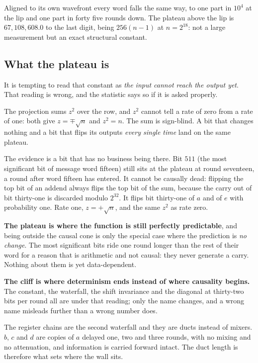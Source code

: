 Aligned to its own wavefront every word falls the same way, to one part in \(10^{4}\) at the lip and
one part in forty five rounds down. The plateau above the lip is \(67{,}108{,}608.0\) to the last
digit, being \(256(n-1)\) at \(n = 2^{18}\): not a large measurement but an exact structural
constant.

\subsection{What the plateau is}

It is tempting to read that constant as \emph{the input cannot reach the output yet}. That reading
is wrong, and the statistic says so if it is asked properly.

The projection sums \(z^{2}\) over the row, and \(z^{2}\) cannot tell a rate of zero from a rate of
one: both give \(z = \mp\sqrt{n}\) and \(z^{2} = n\). The sum is sign-blind. A bit that changes
nothing and a bit that flips its outputs \emph{every single time} land on the same plateau.

The evidence is a bit that has no business being there. Bit \(511\) (the most significant bit of
message word fifteen) still sits at the plateau at round seventeen, a round after word fifteen
has entered. It cannot be causally dead: flipping the top bit of an addend always flips the top bit
of the sum, because the carry out of bit thirty-one is discarded modulo \(2^{32}\). It flips bit
thirty-one of \(a\) and of \(e\) with probability one. Rate one, \(z = +\sqrt{n}\), and the same
\(z^{2}\) as rate zero.

\textbf{The plateau is where the function is still perfectly predictable}, and being outside the
causal cone is only the special case where the prediction is \emph{no change}. The most significant
bits ride one round longer than the rest of their word for a reason that is arithmetic and not
causal: they never generate a carry. Nothing about them is yet data-dependent.

\textbf{The cliff is where determinism ends instead of where causality begins.} The constant, the
waterfall, the shift invariance and the diagonal at thirty-two bits per round all are under that
reading; only the name changes, and a wrong name misleads further than a wrong number does.

The register chains are the second waterfall and they are ducts instead of mixers. \(b\), \(c\)
and \(d\) are copies of \(a\) delayed one, two and three rounds, with no mixing and no attenuation,
and information is carried forward intact. The duct length is therefore what sets where the wall
sits.

